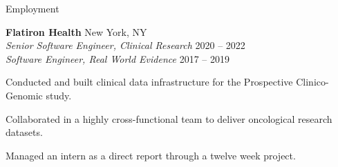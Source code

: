 \documentclass{resume} %
\begin{document}

\begin{grouping}{Employment}

\iffalse
\item {\bf Brown University } \hfill Providence, RI \\
    {\em Research Assistant} \hfill 2023
    \begin{items}
        \item Worked with Peihan Miao on three research projects.
    \end{items}
\fi

\item {\bf Flatiron Health } \hfill New York, NY \\
    {\em Senior Software Engineer, Clinical Research } \hfill 2020 -- 2022 \\
    {\em Software Engineer, Real World Evidence } \hfill 2017 -- 2019
    \begin{items}
        \item Conducted and built clinical data infrastructure for the Prospective Clinico-Genomic study.
        \item Collaborated in a highly cross-functional team to deliver oncological research datasets.
        \item Managed an intern as a direct report through a twelve week project.
    \end{items}

\iffalse
\hspace*{3mm}- Conducted Prospective Clinico-Genomic (PCG) study with cross-functional team \\
\hspace*{3mm}- Developed system for sending data quality inquiries to study practices \\
\hspace*{3mm}- Managed an intern as a direct report through a 12 week project
\fi

\iffalse
\hspace*{3mm}- Collaborated in a highly cross-functional team to deliver 11 projects \\
\hspace*{3mm}- Built data pipelines to create oncological research datasets \\
\hspace*{3mm}- Designed and implemented tools to automate team processes
\fi


\end{grouping}
\end{document}
